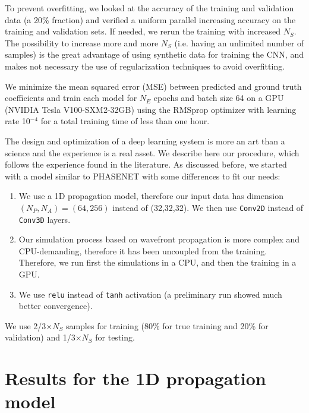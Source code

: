 \documentclass[preprint]{iucr}
\begin{document}
To prevent overfitting, we looked at the accuracy of the training and validation data (a 20\% fraction) and verified a uniform parallel increasing accuracy on the training and validation sets. If needed, we rerun the training with increased $N_S$. The possibility to increase more and more $N_S$ (i.e. having an unlimited number of samples) is the great advantage of using synthetic data for training the CNN, and makes not necessary the use of regularization techniques to avoid overfitting.

We minimize the mean squared error (MSE) between predicted and ground truth coefficients and train each model for $N_E$ epochs and batch size 64 on a GPU (NVIDIA Tesla V100-SXM2-32GB) using the RMSprop optimizer with learning rate 10$^{-4}$ for a total training time of less than one hour.

The design and optimization of a deep learning system is more an art than a science \cite{chollet_book} and the experience is a real asset. We describe here our procedure, which follows the experience found in the literature. As discussed before, we started with a model similar to PHASENET \cite{Saha2020} with some differences to fit our needs: 
\begin{enumerate}
    \item We use a 1D propagation model, therefore our input data has dimension $(N_P,N_A)=(64,256)$ instead of (32,32,32). We then use \texttt{Conv2D} instead of \texttt{Conv3D} layers. 
    \item Our simulation process based on wavefront propagation is more complex and CPU-demanding, therefore it has been uncoupled from the training. Therefore, we run first the simulations in a CPU, and then the training in a GPU.
    \item We use \texttt{relu} instead of \texttt{tanh} activation (a preliminary run showed much better convergence). 
\end{enumerate}

 We use 2/3$\times N_S$ samples for training (80\% for true training and 20\% for validation) and 1/3$\times N_S$ for testing. 

\section{Results for the 1D propagation model}\label{sec:results}
\end{document}
